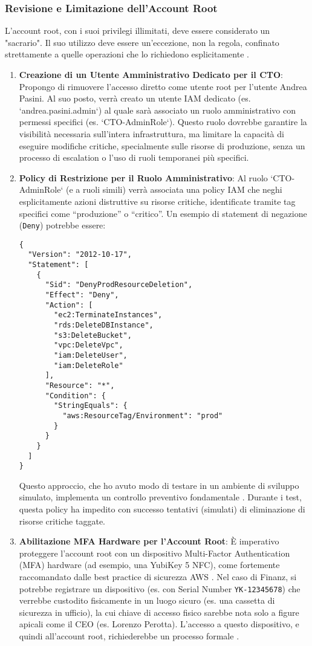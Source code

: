 \subsubsection{Revisione e Limitazione dell'Account Root}
L'account root, con i suoi privilegi illimitati, deve essere considerato un "sacrario". Il suo utilizzo deve essere un'eccezione, non la regola, confinato strettamente a quelle operazioni che lo richiedono esplicitamente \cite{aws:iam:bestpractices}.
\begin{enumerate}
    \item \textbf{Creazione di un Utente Amministrativo Dedicato per il CTO}: Propongo di rimuovere l'accesso diretto come utente root per l'utente Andrea Pasini. Al suo posto, verrà creato un utente IAM dedicato (es. `andrea.pasini.admin`) al quale sarà associato un ruolo amministrativo con permessi specifici (es. `CTO-AdminRole`). Questo ruolo dovrebbe garantire la visibilità necessaria sull'intera infrastruttura, ma limitare la capacità di eseguire modifiche critiche, specialmente sulle risorse di produzione, senza un processo di escalation o l'uso di ruoli temporanei più specifici.
    \item \textbf{Policy di Restrizione per il Ruolo Amministrativo}: Al ruolo `CTO-AdminRole` (e a ruoli simili) verrà associata una policy IAM che neghi esplicitamente azioni distruttive su risorse critiche, identificate tramite tag specifici come \enquote{produzione} o \enquote{critico}. Un esempio di statement di negazione (\texttt{Deny}) potrebbe essere:
    \begin{lstlisting}[style=json, caption={Policy IAM per negare eliminazioni in produzione}, label=lst:deny-prod-delete]
{
  "Version": "2012-10-17",
  "Statement": [
    {
      "Sid": "DenyProdResourceDeletion",
      "Effect": "Deny",
      "Action": [
        "ec2:TerminateInstances",
        "rds:DeleteDBInstance",
        "s3:DeleteBucket",
        "vpc:DeleteVpc",
        "iam:DeleteUser",
        "iam:DeleteRole"
      ],
      "Resource": "*",
      "Condition": {
        "StringEquals": {
          "aws:ResourceTag/Environment": "prod"
        }
      }
    }
  ]
}
    \end{lstlisting}
    Questo approccio, che ho avuto modo di testare in un ambiente di sviluppo simulato, implementa un controllo preventivo fondamentale \cite{aws:iam:boundaries}. Durante i test, questa policy ha impedito con successo tentativi (simulati) di eliminazione di risorse critiche taggate.
    \item \textbf{Abilitazione MFA Hardware per l'Account Root}: È imperativo proteggere l'account root con un dispositivo Multi-Factor Authentication (MFA) hardware (ad esempio, una YubiKey 5 NFC), come fortemente raccomandato dalle best practice di sicurezza AWS \cite{clouddefense:mfa}. Nel caso di Finanz, si potrebbe registrare un dispositivo (es. con Serial Number \texttt{YK-12345678}) che verrebbe custodito fisicamente in un luogo sicuro (es. una cassetta di sicurezza in ufficio), la cui chiave di accesso fisico sarebbe nota solo a figure apicali come il CEO (es. Lorenzo Perotta). L'accesso a questo dispositivo, e quindi all'account root, richiederebbe un processo formale \cite{saraswat:breakglass}.
\end{enumerate}

